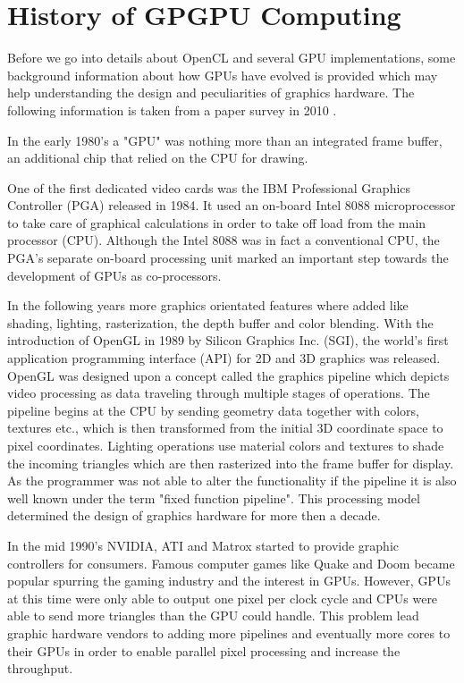 \section{History of GPGPU Computing} 
\label{sec:history}
Before we go into details about OpenCL and several GPU implementations, some background information about how GPUs have evolved is provided which may help understanding the design and peculiarities of graphics hardware. The following information is taken from a paper survey in 2010 \cite{gpu_history}.

In the early 1980's a "GPU" was nothing more than an integrated frame buffer, an additional chip that relied on the CPU for drawing.

One of the first dedicated video cards was the IBM Professional Graphics Controller (PGA) released in 1984. It used an on-board Intel 8088 microprocessor to take care of graphical calculations in order to take off load from the main processor (CPU). Although the Intel 8088 was in fact a conventional CPU, the PGA's separate on-board processing unit marked an important step towards the development of GPUs as co-processors.

In the following years more graphics orientated features where added like shading, lighting, rasterization, the depth buffer and color blending. With the introduction of OpenGL in 1989 by Silicon Graphics Inc. (SGI), the world's first application programming interface (API) for 2D and 3D graphics was released. OpenGL was designed upon a concept called the graphics pipeline which depicts video processing as data traveling through multiple stages of operations. The pipeline begins at the CPU by sending geometry data together with colors, textures etc., which is then transformed from the initial 3D coordinate space to pixel coordinates. Lighting operations use material colors and textures to shade the incoming triangles which are then rasterized into the frame buffer for display. As the programmer was not able to alter the functionality if the pipeline it is also well known under the term "fixed function pipeline". This processing model determined the design of graphics hardware for more then a decade.

In the mid 1990's NVIDIA, ATI and Matrox started to provide graphic controllers for consumers. Famous computer games like Quake and Doom became popular spurring the gaming industry and the interest in GPUs. However, GPUs at this time were only able to output one pixel per clock cycle and CPUs were able to send more triangles than the GPU could handle. This problem lead graphic hardware vendors to adding more pipelines and eventually more cores to their GPUs in order to enable parallel pixel processing and increase the throughput.

